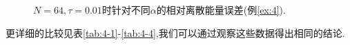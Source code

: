 \begin{figure}[H]
\begin{center}
  \caption{$N = 64,\tau=0.01$时针对不同$\alpha$的相对离散能量误差(例\ref{ex:4}).} \label{fig:12}
\end{center}
\end{figure}

更详细的比较见表\ref{tab:4-1}-\ref{tab:4-4},我们可以通过观察这些数据得出相同的结论.

